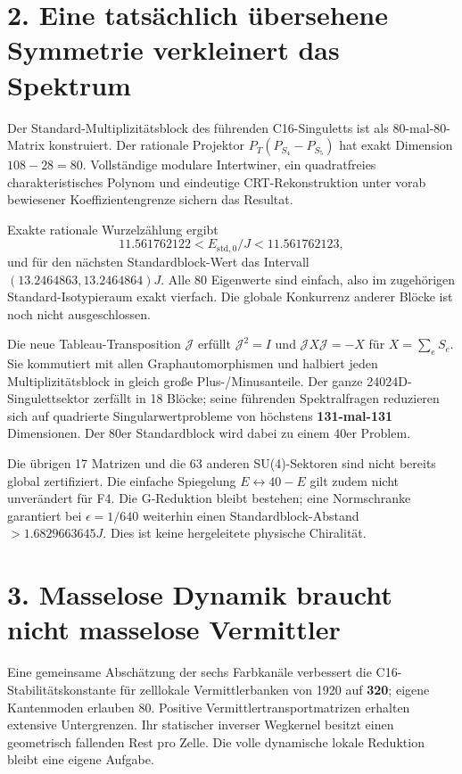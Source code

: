 \section*{2. Eine tatsächlich übersehene Symmetrie verkleinert das Spektrum}
Der Standard-Multiplizitätsblock des führenden C16-Singuletts ist als 80-mal-80-Matrix konstruiert. Der rationale Projektor $P_T(P_{S_4}-P_{S_5})$ hat exakt Dimension $108-28=80$. Vollständige modulare Intertwiner, ein quadratfreies charakteristisches Polynom und eindeutige CRT-Rekonstruktion unter vorab bewiesener Koeffizientengrenze sichern das Resultat.

Exakte rationale Wurzelzählung ergibt
\[
11.561762122<E_{\mathrm{std},0}/J<11.561762123,
\]
und für den nächsten Standardblock-Wert das Intervall $(13.2464863,13.2464864)J$. Alle 80 Eigenwerte sind einfach, also im zugehörigen Standard-Isotypieraum exakt vierfach. Die globale Konkurrenz anderer Blöcke ist noch nicht ausgeschlossen.

Die neue Tableau-Transposition $\mathcal J$ erfüllt $\mathcal J^2=I$ und $\mathcal JX\mathcal J=-X$ für $X=\sum_eS_e$. Sie kommutiert mit allen Graphautomorphismen und halbiert jeden Multiplizitätsblock in gleich große Plus-/Minusanteile. Der ganze 24024D-Singulettsektor zerfällt in 18 Blöcke; seine führenden Spektralfragen reduzieren sich auf quadrierte Singularwertprobleme von höchstens \textbf{131-mal-131} Dimensionen. Der 80er Standardblock wird dabei zu einem 40er Problem.

Die übrigen 17 Matrizen und die 63 anderen SU(4)-Sektoren sind nicht bereits global zertifiziert. Die einfache Spiegelung $E\leftrightarrow40-E$ gilt zudem nicht unverändert für F4. Die G-Reduktion bleibt bestehen; eine Normschranke garantiert bei $\epsilon=1/640$ weiterhin einen Standardblock-Abstand $>1.6829663645J$. Dies ist keine hergeleitete physische Chiralität.

\section*{3. Masselose Dynamik braucht nicht masselose Vermittler}
Eine gemeinsame Abschätzung der sechs Farbkanäle verbessert die C16-Stabilitätskonstante für zelllokale Vermittlerbanken von 1920 auf \textbf{320}; eigene Kantenmoden erlauben 80. Positive Vermittlertransportmatrizen erhalten extensive Untergrenzen. Ihr statischer inverser Wegkernel besitzt einen geometrisch fallenden Rest pro Zelle. Die volle dynamische lokale Reduktion bleibt eine eigene Aufgabe.

